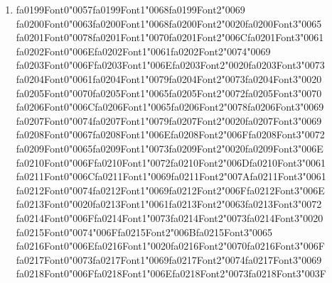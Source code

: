 \documentclass[12pt]{article}
\begin{document}
\begin{enumerate}[label=Q\arabic*.]
 \item {\csname fa0199Font0\endcsname\char"0057}{\csname fa0199Font1\endcsname\char"0068}{\csname fa0199Font2\endcsname\char"0069} {\csname fa0200Font0\endcsname\char"0063}{\csname fa0200Font1\endcsname\char"0068}{\csname fa0200Font2\endcsname\char"0020}{\csname fa0200Font3\endcsname\char"0065} {\csname fa0201Font0\endcsname\char"0078}{\csname fa0201Font1\endcsname\char"0070}{\csname fa0201Font2\endcsname\char"006C}{\csname fa0201Font3\endcsname\char"0061} {\csname fa0202Font0\endcsname\char"006E}{\csname fa0202Font1\endcsname\char"0061}{\csname fa0202Font2\endcsname\char"0074}{\char"0069} {\csname fa0203Font0\endcsname\char"006F}{\csname fa0203Font1\endcsname\char"006E}{\csname fa0203Font2\endcsname\char"0020}{\csname fa0203Font3\endcsname\char"0073} {\csname fa0204Font0\endcsname\char"0061}{\csname fa0204Font1\endcsname\char"0079}{\csname fa0204Font2\endcsname\char"0073}{\csname fa0204Font3\endcsname\char"0020} {\csname fa0205Font0\endcsname\char"0070}{\csname fa0205Font1\endcsname\char"0065}{\csname fa0205Font2\endcsname\char"0072}{\csname fa0205Font3\endcsname\char"0070} {\csname fa0206Font0\endcsname\char"006C}{\csname fa0206Font1\endcsname\char"0065}{\csname fa0206Font2\endcsname\char"0078}{\csname fa0206Font3\endcsname\char"0069} {\csname fa0207Font0\endcsname\char"0074}{\csname fa0207Font1\endcsname\char"0079}{\csname fa0207Font2\endcsname\char"0020}{\csname fa0207Font3\endcsname\char"0069} {\csname fa0208Font0\endcsname\char"0067}{\csname fa0208Font1\endcsname\char"006E}{\csname fa0208Font2\endcsname\char"006F}{\csname fa0208Font3\endcsname\char"0072} {\csname fa0209Font0\endcsname\char"0065}{\csname fa0209Font1\endcsname\char"0073}{\csname fa0209Font2\endcsname\char"0020}{\csname fa0209Font3\endcsname\char"006E} {\csname fa0210Font0\endcsname\char"006F}{\csname fa0210Font1\endcsname\char"0072}{\csname fa0210Font2\endcsname\char"006D}{\csname fa0210Font3\endcsname\char"0061} {\csname fa0211Font0\endcsname\char"006C}{\csname fa0211Font1\endcsname\char"0069}{\csname fa0211Font2\endcsname\char"007A}{\csname fa0211Font3\endcsname\char"0061} {\csname fa0212Font0\endcsname\char"0074}{\csname fa0212Font1\endcsname\char"0069}{\csname fa0212Font2\endcsname\char"006F}{\csname fa0212Font3\endcsname\char"006E} {\csname fa0213Font0\endcsname\char"0020}{\csname fa0213Font1\endcsname\char"0061}{\csname fa0213Font2\endcsname\char"0063}{\csname fa0213Font3\endcsname\char"0072} {\csname fa0214Font0\endcsname\char"006F}{\csname fa0214Font1\endcsname\char"0073}{\csname fa0214Font2\endcsname\char"0073}{\csname fa0214Font3\endcsname\char"0020} {\csname fa0215Font0\endcsname\char"0074}{\char"006F}{\csname fa0215Font2\endcsname\char"006B}{\csname fa0215Font3\endcsname\char"0065} {\csname fa0216Font0\endcsname\char"006E}{\csname fa0216Font1\endcsname\char"0020}{\csname fa0216Font2\endcsname\char"0070}{\csname fa0216Font3\endcsname\char"006F} {\csname fa0217Font0\endcsname\char"0073}{\csname fa0217Font1\endcsname\char"0069}{\csname fa0217Font2\endcsname\char"0074}{\csname fa0217Font3\endcsname\char"0069} {\csname fa0218Font0\endcsname\char"006F}{\csname fa0218Font1\endcsname\char"006E}{\csname fa0218Font2\endcsname\char"0073}{\csname fa0218Font3\endcsname\char"003F}

\end{enumerate}
\end{document}

